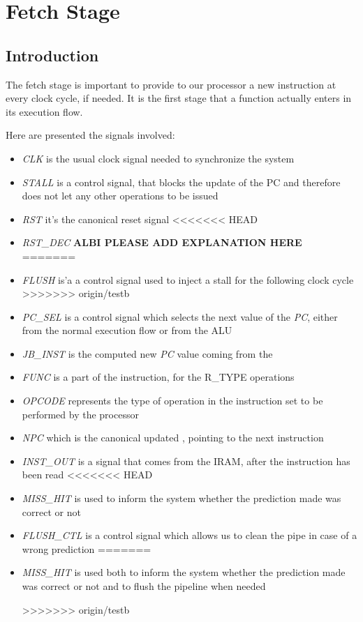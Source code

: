 \section{Fetch Stage}
\label{chap_ft}

\subsection{Introduction}
The fetch stage is important to provide to our processor a new instruction at every clock cycle, if needed. It is the first stage that a function actually enters in its execution flow.

Here are presented the signals involved:
\begin{itemize}
	\item \textit{CLK} is the usual clock signal needed to synchronize the system
	\item \textit{STALL} is a control signal, that blocks the update of the \textsf{PC} and therefore does not let any other operations to be issued
	\item \textit{RST} it's the canonical reset signal
<<<<<<< HEAD
	\item \textit{RST\_DEC} \textbf{ALBI PLEASE ADD EXPLANATION HERE}
=======
	\item \textit{FLUSH} is'a a control signal used to inject a stall for the 
	following clock cycle
>>>>>>> origin/testb
	\item \textit{PC\_SEL} is a control signal which selects the next value of the \textit{PC}, either from the normal execution flow or from the ALU
	\item \textit{JB\_INST} is the computed new \textit{PC} value coming from the \alu
	\item \textit{FUNC} is a part of the instruction, for the \textsc{R\_TYPE} operations
	\item \textit{OPCODE} represents the type of operation in the instruction set to be performed by the processor
	\item \textit{NPC} which is the canonical updated \pc, pointing to the next instruction
	\item \textit{INST\_OUT} is a signal that comes from the IRAM, after the instruction has been read
<<<<<<< HEAD
	\item \textit{MISS\_HIT} is used to inform the system whether the prediction made was correct or not
	\item \textit{FLUSH\_CTL} is a control signal which allows us to clean the pipe in case of a wrong prediction
=======
	\item \textit{MISS\_HIT} is used both to inform the system whether the 
	prediction made was correct or not and to flush the pipeline when needed

>>>>>>> origin/testb
\end{itemize}

